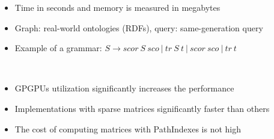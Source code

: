 \documentclass[a0paper,portrait]{baposter}
\begin{document}
\begin{poster}
{\begin{minipage}[t]{0.5\textwidth}
	\vspace{0.05cm}
	\begin{itemize}
		\item Time in seconds and memory is measured in megabytes
		\item  Graph: real-world ontologies (RDFs), query: same-generation query
		\item Example of a grammar: $S \to \textit{scor} \ S \ \textit{sco} \ | \ \textit{tr} \ S \ \textit{t} \ | \ \textit{scor} \ \textit{sco} \ | \ \textit{tr} \ \textit{t}$
	\end{itemize}
\end{minipage}
~
\begin{minipage}[t]{0.48\textwidth}
\vspace{0.05cm}
  \begin{itemize}
  	\item GPGPUs utilization significantly increases the performance
  	\item Implementations with sparse matrices significantly faster than others
  	\item The cost of computing matrices with PathIndexes is not high
  \end{itemize}
\end{minipage}
}



\end{poster}
\end{document}
